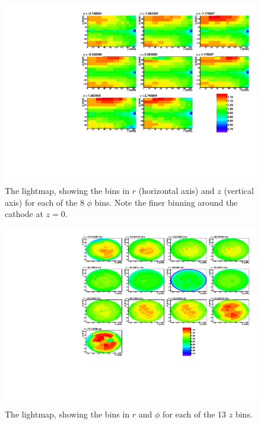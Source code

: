 \documentclass[herrin-thesis.tex]{subfiles}
\begin{document}
\begin{figure}
\centering
\includegraphics[width=\textwidth]{./plots/lightmap_binned_phi_slices.pdf}
\caption[Lightmap \(\phi\) slices]{The lightmap, showing the bins in \(r\) (horizontal axis) and \(z\) (vertical axis) for each of the 8 \(\phi\) bins. Note the finer binning around the cathode at \(z=0\).}
\label{fig:lightmap_binned_phi_slices}
\end{figure}

\begin{figure}
\centering
\includegraphics[width=\textwidth]{./plots/lightmap_binned_z_slices.pdf}
\caption[Lightmap \(z\) slices]{The lightmap, showing the bins in \(r\) and \(\phi\) for each of the 13 \(z\) bins.}
\label{fig:lightmap_binned_z_slices}
\end{figure}
\end{document}
